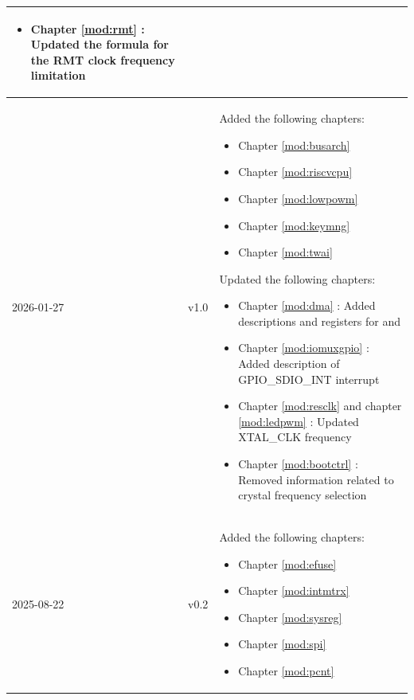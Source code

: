 \begin{longtable}[l]{ | m{2cm} | m{1.5cm} | m{12cm} | }
\begin{itemize}
        \item Chapter \ref{mod:rmt} \textit{\nameref{mod:rmt}}: Updated the formula for the RMT clock frequency limitation %
    \end{itemize}
    \\\hline
    2026-01-27 & v1.0 & Added the following chapters:
    \begin{itemize}
        \item Chapter \ref{mod:busarch} \textit{\nameref{mod:busarch}}
        \item Chapter \ref{mod:riscvcpu} \textit{\nameref{mod:riscvcpu}}
        \item Chapter \ref{mod:lowpowm} \textit{\nameref{mod:lowpowm}}
        \item Chapter \ref{mod:keymng} \textit{\nameref{mod:keymng}}
        \item Chapter \ref{mod:twai} \textit{\nameref{mod:twai}}
    \end{itemize}
    Updated the following chapters:
    \begin{itemize}
        \item Chapter \ref{mod:dma} \textit{\nameref{mod:dma}}: Added descriptions and registers for \nameref{sec:dma-bus-error-resp} and \nameref{sec:dma-auto-clk-gating}
        \item Chapter \ref{mod:iomuxgpio} \textit{\nameref{mod:iomuxgpio}}: Added description of GPIO\_SDIO\_INT interrupt
        \item Chapter \ref{mod:resclk} \textit{\nameref{mod:resclk}} and chapter \ref{mod:ledpwm} \textit{\nameref{mod:ledpwm}}: Updated XTAL\_CLK frequency
        \item Chapter \ref{mod:bootctrl} \textit{\nameref{mod:bootctrl}}: Removed information related to crystal frequency selection
    \end{itemize}
    \\\hline
    2025-08-22 & v0.2 & Added the following chapters:
    \begin{itemize}
        \item Chapter \ref{mod:efuse} \textit{\nameref{mod:efuse}}
        \item Chapter \ref{mod:intmtrx} \textit{\nameref{mod:intmtrx}}
        \item Chapter \ref{mod:sysreg} \textit{\nameref{mod:sysreg}}
        \item Chapter \ref{mod:spi} \textit{\nameref{mod:spi}}
        \item Chapter \ref{mod:pcnt} \textit{\nameref{mod:pcnt}}

\end{itemize}
\end{longtable}
